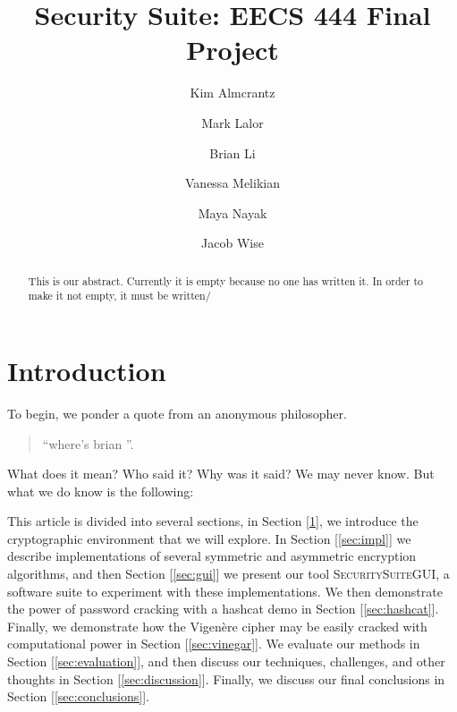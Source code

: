 \documentclass[acmlarge]{acmart}
\begin{document}
\title{Security Suite: EECS 444 Final Project}

\author{Kim Almcrantz}

\author{Mark Lalor}

\author{Brian Li}

\author{Vanessa Melikian}

\author{Maya Nayak}

\author{Jacob Wise}



\begin{abstract}
This is our abstract. Currently it is empty because no one has written it. In order to make it not empty, it must be written/
\end{abstract}


\maketitle


\section{Introduction}\label{sec:intro}

To begin, we ponder a quote from an anonymous philosopher.
\begin{quote}
  ``where's brian ''.
\end{quote}
What does it mean? Who said it? Why was it said? We may never know. But what we do know is the following:

This article is divided into several sections, in Section [\ref{sec:intro}], we introduce the cryptographic environment that we will explore. In Section [\ref{sec:impl}] we describe implementations of several symmetric and asymmetric encryption algorithms, and then Section [\ref{sec:gui}] we present our tool \textsc{SecuritySuiteGUI}, a software suite to experiment with these implementations. We then demonstrate the power of password cracking with a hashcat demo in Section [\ref{sec:hashcat}]. Finally, we demonstrate how the Vigenère cipher may be easily cracked with computational power in Section [\ref{sec:vinegar}]. We evaluate our methods in Section [\ref{sec:evaluation}], and then discuss our techniques, challenges, and other thoughts in Section [\ref{sec:discussion}]. Finally, we discuss our final conclusions in Section [\ref{sec:conclusions}].
\end{document}
